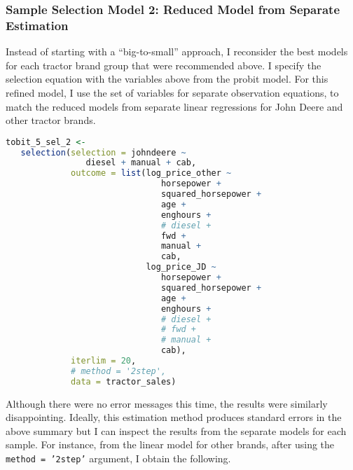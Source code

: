 \documentclass[11pt]{paper}
\begin{document}
\subsubsection{Sample Selection Model 2: Reduced Model from Separate Estimation}

Instead of starting with a ``big-to-small'' approach,
I reconsider the best models for each tractor brand group 
that were recommended above.
I specify the selection equation with the variables above
from the probit model.
For this refined model, I use the set of variables
for separate observation equations,
to match the reduced models from separate linear regressions
for John Deere and other tractor brands.


\begin{lstlisting}[language=R]
tobit_5_sel_2 <-
   selection(selection = johndeere ~
                diesel + manual + cab,
             outcome = list(log_price_other ~
                               horsepower +
                               squared_horsepower +
                               age +
                               enghours +
                               # diesel +
                               fwd +
                               manual +
                               cab,
                            log_price_JD ~
                               horsepower +
                               squared_horsepower +
                               age +
                               enghours +
                               # diesel +
                               # fwd +
                               # manual +
                               cab),
             iterlim = 20,
             # method = '2step',
             data = tractor_sales)

\end{lstlisting}

Although there were no error messages this time, 
the results were similarly disappointing. 
Ideally, this estimation method produces standard errors in the above summary
but I can inspect the results from the separate models for each sample.
For instance, from the linear model for other brands, 
after using the \texttt{method = '2step'} argument, I obtain the following.
\end{document}
